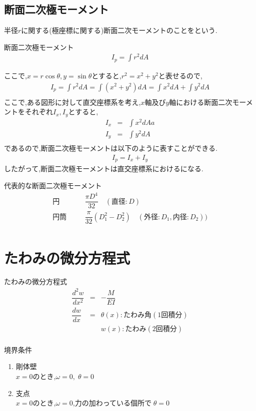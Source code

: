 \documentclass[a4paper]{jsarticle}
\begin{document}
\subsection{断面二次極モーメント}
半径$r$に関する(極座標に関する)断面二次モーメントのことをという.
\begin{itembox}[l]{断面二次極モーメント}
    \begin{eqnarray*}
        \displaystyle I_p=\int r^2dA
    \end{eqnarray*}
\end{itembox}
ここで,$x=r\cos\theta,y=\sin\theta$とすると,$r^2=x^2+y^2$と表せるので,
\begin{eqnarray*}
    \displaystyle I_p=\int r^2dA=\int \left(x^2+y^2\right)dA=\int x^2dA+\int y^2dA\\
\end{eqnarray*}
ここで,ある図形に対して直交座標系を考え,$x$軸及び$y$軸における断面二次モーメントをそれぞれ$I_x,I_y$とすると,
\begin{eqnarray*}
    \displaystyle
    I_x&=&\int x^2dAa\\
    I_y&=&\int y^2dA\\
\end{eqnarray*}
であるので,断面二次極モーメントは以下のように表すことができる.
\begin{eqnarray*}
    I_p=I_x+I_y
\end{eqnarray*}
したがって,断面二次極モーメントは直交座標系におけるになる.\\
\begin{itembox}[l]{代表的な断面二次極モーメント}
    \begin{eqnarray*}
        円\qquad&&\dfrac{\pi D^4}{32}\quad(直径:D)\\
        円筒\quad&&\dfrac{\pi}{32}\left(D_1^2-D_2^2\right)\quad(外径:D_1,内径:D_2))\\
    \end{eqnarray*}
\end{itembox}
\section{たわみの微分方程式}
\begin{itembox}[l]{たわみの微分方程式}
    \begin{eqnarray*}
        \dfrac{d^2w}{dx^2}&=&-\dfrac{M}{EI}\\
        \dfrac{dw}{dx}&=&\theta\left(x\right):たわみ角 (1回積分)\\
        &&w\left(x\right):たわみ(2回積分)\\
    \end{eqnarray*}
\end{itembox}
\begin{itembox}[l]{境界条件}
    \begin{enumerate}[(1)]
        \item 剛体壁\\
              $x=0$のとき,\quad$\omega=0,\;\theta=0$
        \item 支点\\
              $x=0$のとき,\quad$\omega=0$,力の加わっている個所で$\;\theta =0$
    \end{enumerate}
\end{itembox}
\end{document}

